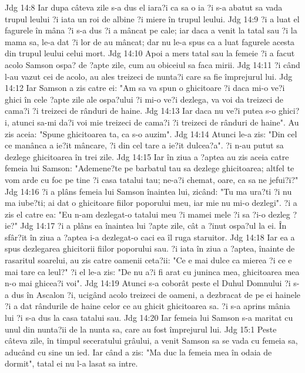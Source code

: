 Jdg 14:8  Iar dupa câteva zile s-a dus el iara?i ca sa o ia ?i s-a abatut sa vada trupul leului ?i iata un roi de albine ?i miere în trupul leului.
Jdg 14:9  ?i a luat el fagurele în mâna ?i s-a dus ?i a mâncat pe cale; iar daca a venit la tatal sau ?i la mama sa, le-a dat ?i lor de au mâncat; dar nu le-a spus ca a luat fagurele acesta din trupul leului celui mort.
Jdg 14:10  Apoi a mers tatal sau la femeie ?i a facut acolo Samson ospa? de ?apte zile, cum au obiceiul sa faca mirii.
Jdg 14:11  ?i când l-au vazut cei de acolo, au ales treizeci de nunta?i care sa fie împrejurul lui.
Jdg 14:12  Iar Samson a zis catre ei: "Am sa va spun o ghicitoare ?i daca mi-o ve?i ghici în cele ?apte zile ale ospa?ului ?i mi-o ve?i dezlega, va voi da treizeci de cama?i ?i treizeci de rânduri de haine.
Jdg 14:13  Iar daca nu ve?i putea s-o ghici?i, atunci sa-mi da?i voi mie treizeci de cama?i ?i treizeci de rânduri de haine". Au zis aceia: "Spune ghicitoarea ta, ca s-o auzim".
Jdg 14:14  Atunci le-a zis: "Din cel ce manânca a ie?it mâncare, ?i din cel tare a ie?it dulcea?a". ?i n-au putut sa dezlege ghicitoarea în trei zile.
Jdg 14:15  Iar în ziua a ?aptea au zis aceia catre femeia lui Samson: "Ademene?te pe barbatul tau sa dezlege ghicitoarea; altfel te vom arde cu foc pe tine ?i casa tatalui tau; ne-a?i chemat, oare, ca sa ne jefui?i?"
Jdg 14:16  ?i a plâns femeia lui Samson înaintea lui, zicând: "Tu ma ura?ti ?i nu ma iube?ti; ai dat o ghicitoare fiilor poporului meu, iar mie nu mi-o dezlegi". ?i a zis el catre ea: "Eu n-am dezlegat-o tatalui meu ?i mamei mele ?i sa ?i-o dezleg ?ie?"
Jdg 14:17  ?i a plâns ea înaintea lui ?apte zile, cât a ?inut ospa?ul la ei. În sfâr?it în ziua a ?aptea i-a dezlegat-o caci ea îl ruga staruitor.
Jdg 14:18  Iar ea a spus dezlegarea ghicitorii fiilor poporului sau. ?i iata în ziua a ?aptea, înainte de rasaritul soarelui, au zis catre oamenii ceta?ii: "Ce e mai dulce ca mierea ?i ce e mai tare ca leul?" ?i el le-a zis: "De nu a?i fi arat cu juninca mea, ghicitoarea mea n-o mai ghicea?i voi".
Jdg 14:19  Atunci s-a coborât peste el Duhul Domnului ?i s-a dus în Ascalon ?i, ucigând acolo treizeci de oameni, a dezbracat de pe ei hainele ?i a dat rândurile de haine celor ce au ghicit ghicitoarea sa. ?i s-a aprins mânia lui ?i s-a dus la casa tatalui sau.
Jdg 14:20  Iar femeia lui Samson s-a maritat cu unul din nunta?ii de la nunta sa, care au fost împrejurul lui.
Jdg 15:1  Peste câteva zile, în timpul seceratului grâului, a venit Samson sa se vada cu femeia sa, aducând cu sine un ied. Iar când a zis: "Ma duc la femeia mea în odaia de dormit", tatal ei nu l-a lasat sa intre.
